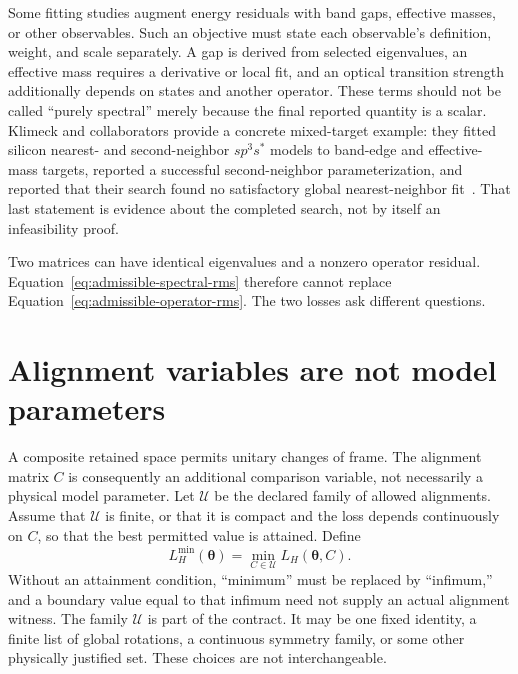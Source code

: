 Some fitting studies augment energy residuals with band gaps, effective masses,
or other observables. Such an objective must state each observable's definition,
weight, and scale separately. A gap is derived from selected eigenvalues, an
effective mass requires a derivative or local fit, and an optical transition
strength additionally depends on states and another operator. These terms
should not be called ``purely spectral'' merely because the final reported
quantity is a scalar. Klimeck and collaborators provide a concrete mixed-target
example: they fitted silicon nearest- and second-neighbor $sp^3s^{\ast}$ models
to band-edge and effective-mass targets, reported a successful second-neighbor
parameterization, and reported that their search found no satisfactory global
nearest-neighbor fit~\cite{klimeck2000}. That last statement is evidence about
the completed search, not by itself an infeasibility proof.

Two matrices can have identical eigenvalues and a nonzero operator residual.
Equation~\eqref{eq:admissible-spectral-rms} therefore cannot replace
Equation~\eqref{eq:admissible-operator-rms}. The two losses ask different
questions.

\section{Alignment variables are not model parameters}

A composite retained space permits unitary changes of frame. The alignment
matrix $C$ is consequently an additional comparison variable, not necessarily
a physical model parameter. Let $\mathcal U$ be the declared family of allowed
alignments. Assume that $\mathcal U$ is finite, or that it is compact and the
loss depends continuously on $C$, so that the best permitted value is attained.
Define
\begin{equation}
  L_H^{\min}(\boldsymbol\theta)
  =
  \min_{C\in\mathcal U}L_H(\boldsymbol\theta,C).
  \label{eq:admissible-minimized-operator-loss}
\end{equation}
Without an attainment condition, ``minimum'' must be replaced by ``infimum,''
and a boundary value equal to that infimum need not supply an actual alignment
witness. The family $\mathcal U$ is part of the contract. It may be one fixed identity,
a finite list of global rotations, a continuous symmetry family, or some other
physically justified set. These choices are not interchangeable.

